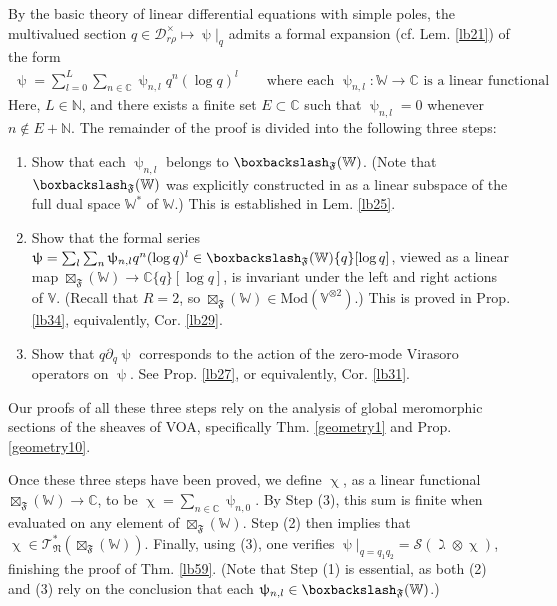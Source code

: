\documentclass[11pt,b5paper,notitlepage]{article}
\theoremstyle{definition}
\theoremstyle{plain}
\newcommand{\Vbb}{\mathbb V}
\newcommand{\Wbb}{\mathbb W}
\newcommand{\Cbb}{\mathbb C}
\newcommand{\Nbb}{\mathbb N}
\newcommand{\<}{\left\langle}
\renewcommand{\>}{\right\rangle}
\newcommand{\ST}{\mathscr{T}}
\newcommand{\MD}{\mathcal{D}}
\newcommand{\MS}{\mathcal{S}}
\newcommand{\bbs}{\boxbackslash}
\newcommand{\Mod}{\mathrm{Mod}}
\newcommand{\fn}{\mathfrak{N}}
\newcommand{\ff}{\mathfrak{F}}
\numberwithin{equation}{section}
\begin{document}
By the basic theory of linear differential equations with simple poles, the multivalued section $q\in\MD_{r\rho}^\times\mapsto\uppsi|_q$ admits a formal expansion (cf. Lem. \ref{lb21}) of the form
\begin{align*}
\uppsi=\sum_{l=0}^L\sum_{n\in\Cbb}\uppsi_{n,l}q^n(\log q)^l\qquad \text{where each }\uppsi_{n,l}:\Wbb\rightarrow\Cbb\text{ is a linear functional}
\end{align*}
Here, $L\in\Nbb$, and there exists a finite set $E\subset\Cbb$ such that $\uppsi_{n,l}=0$ whenever $n\notin E+\Nbb$. The remainder of the proof is divided into the following three steps:
\begin{enumerate}[label=(\arabic*)]
\item Show that each $\uppsi_{n,l}$ belongs to $\bbs_\ff(\Wbb)$. (Note that $\bbs_\ff(\Wbb)$ was explicitly constructed in \cite{GZ1} as a linear subspace of the full dual space $\Wbb^*$ of $\Wbb$.) This is established in Lem. \ref{lb25}.
\item Show that the formal series $\uppsi=\sum_l\sum_n\uppsi_{n,l}q^n(\log q)^l\in\bbs_\ff(\Wbb)\{q\}[\log q]$, viewed as a linear map $\boxtimes_\ff(\Wbb)\rightarrow\Cbb\{q\}[\log q]$, is invariant under the left and right actions of $\Vbb$. (Recall that $R=2$, so $\boxtimes_\ff(\Wbb)\in\Mod(\Vbb^{\otimes 2})$.) This is proved in Prop. \ref{lb34}, equivalently, Cor. \ref{lb29}.
\item Show that $q\partial_q\uppsi$ corresponds to the action of the zero-mode Virasoro operators on $\uppsi$. See Prop. \ref{lb27}, or equivalently, Cor. \ref{lb31}.
\end{enumerate}
Our proofs of all these three steps rely on the analysis of global meromorphic sections of the sheaves of VOA, specifically Thm. \ref{geometry1} and Prop. \ref{geometry10}.

Once these three steps have been proved, we define $\upchi$, as a linear functional $\boxtimes_\ff(\Wbb)\rightarrow\Cbb$, to be $\upchi=\sum_{n\in\Cbb}\uppsi_{n,0}$. By Step (3), this sum is finite when evaluated on any element of $\boxtimes_\ff(\Wbb)$. Step (2) then implies that $\upchi\in\ST^*_\fn(\boxtimes_\ff(\Wbb))$. Finally, using (3), one verifies $\uppsi|_{q=q_1q_2}=\MS(\gimel\otimes\upchi)$, finishing the proof of Thm. \ref{lb59}.  (Note that Step (1) is essential, as both (2) and (3) rely on the conclusion that each $\uppsi_{n,l}\in\bbs_\ff(\Wbb)$.) 
\end{document}
